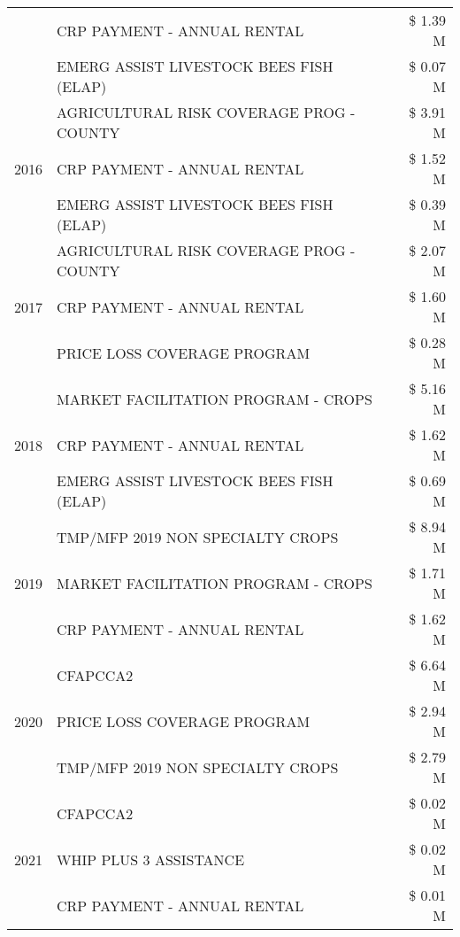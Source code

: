 \begin{tabular}{llr}
 & CRP PAYMENT - ANNUAL RENTAL & \$ 1.39 M \\
 & EMERG ASSIST LIVESTOCK BEES FISH (ELAP) & \$ 0.07 M \\
\cline{1-3}
\multirow[t]{3}{*}{2016} & AGRICULTURAL RISK COVERAGE PROG - COUNTY & \$ 3.91 M \\
 & CRP PAYMENT - ANNUAL RENTAL & \$ 1.52 M \\
 & EMERG ASSIST LIVESTOCK BEES FISH (ELAP) & \$ 0.39 M \\
\cline{1-3}
\multirow[t]{3}{*}{2017} & AGRICULTURAL RISK COVERAGE PROG - COUNTY & \$ 2.07 M \\
 & CRP PAYMENT - ANNUAL RENTAL & \$ 1.60 M \\
 & PRICE LOSS COVERAGE PROGRAM & \$ 0.28 M \\
\cline{1-3}
\multirow[t]{3}{*}{2018} & MARKET FACILITATION PROGRAM - CROPS & \$ 5.16 M \\
 & CRP PAYMENT - ANNUAL RENTAL & \$ 1.62 M \\
 & EMERG ASSIST LIVESTOCK BEES FISH (ELAP) & \$ 0.69 M \\
\cline{1-3}
\multirow[t]{3}{*}{2019} & TMP/MFP 2019 NON SPECIALTY CROPS & \$ 8.94 M \\
 & MARKET FACILITATION PROGRAM - CROPS & \$ 1.71 M \\
 & CRP PAYMENT - ANNUAL RENTAL & \$ 1.62 M \\
\cline{1-3}
\multirow[t]{3}{*}{2020} & CFAPCCA2 & \$ 6.64 M \\
 & PRICE LOSS COVERAGE PROGRAM & \$ 2.94 M \\
 & TMP/MFP 2019 NON SPECIALTY CROPS & \$ 2.79 M \\
\cline{1-3}
\multirow[t]{3}{*}{2021} & CFAPCCA2 & \$ 0.02 M \\
 & WHIP PLUS 3 ASSISTANCE & \$ 0.02 M \\
 & CRP PAYMENT - ANNUAL RENTAL & \$ 0.01 M \\
\cline{1-3}
\bottomrule
\end{tabular}
